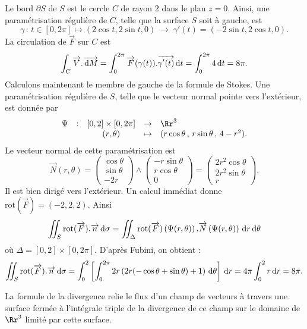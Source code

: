 \documentclass[class=report,crop=false]{standalone}
\begin{document}
\vskip3mm

\noindent Le bord $\partial S$ de $S$ est le cercle $C$ de rayon $2$ dans le plan $z=0$. Ainsi, une paramétrisation régulière de $C$, telle
que la surface $S$ soit à gauche, est 
$$\gamma \,:\,t\in [0,2\pi]\mapsto (2\cos t,2\sin t,0)\; \rightarrow \; \gamma'(t)=(-2\sin t,2\cos t,0).$$
La circulation de $\overrightarrow{F}$ sur $C$ est
$$\int _{C}\overrightarrow{V}.\overrightarrow{\,\mathrm{d} M}=\int _{0}^{2\pi}\overrightarrow{F}(\gamma (t)).\overrightarrow{\gamma '(t)}\,\mathrm{d} t=\int _{0}^{2\pi}4\,\mathrm{d} t=8\pi.$$
Calculons maintenant le membre de gauche de la formule de Stokes. Une paramétrisation
régulière de $S$, telle que le vecteur normal pointe vers l'extérieur, est donnée par 
$$\begin{array}{ccccl}\Psi &:&[0,2]\times [0,2\pi]&\to &\Rr^3\\ &&(r,\theta )&\mapsto & (r\cos \theta \, ,\, r\sin \theta  \, ,\, 4-r^2).\end{array}$$
Le vecteur normal de cette paramétrisation est
$$\overrightarrow{N}(r,\theta)=\left(\begin{array}{c}\cos \theta \\ \sin \theta \\ -2r\end{array}\right)\wedge \left(\begin{array}{c}-r\sin \theta \\ r\cos \theta \\ 0 \end{array}\right)=\left(\begin{array}{c}2r^2\cos \theta \\ 2r^2\sin \theta \\ r \end{array}\right).$$
Il est bien dirigé vers l'extérieur. Un calcul immédiat donne $\mathrm{rot}(\overrightarrow{F})=(-2,2,2)$. Ainsi
$$\int \!\!\!\!\int _S\mathrm{rot}(\overrightarrow{F}).\overrightarrow{n}\d \sigma =\int\!\!\!\!\int _{\Delta}\mathrm{rot}(\overrightarrow{F})\left(\Psi (r,\theta)\right).\overrightarrow{N}\left(\Psi (r,\theta)\right)\d r\d \theta $$
o\`u $\Delta =[0,2]\times [0,2\pi]$. D'après Fubini, on obtient :
$$\int \!\!\!\!\int _S\mathrm{rot}(\overrightarrow{F}).\overrightarrow{n}\,\mathrm{d} \sigma =\int _0^2\left[\int _0^{2\pi}2r\left(2r(-\cos \theta +\sin \theta )+1\right)\,\mathrm{d} \theta\right]\,\mathrm{d} r =4\pi \int _0^2r\,\mathrm{d} r=8\pi.$$

\vskip6mm

\noindent La formule de la divergence relie le flux d'un champ de vecteurs à travers une surface fermée à l'intégrale triple de la divergence de ce champ sur le domaine de $\Rr^3$ limité par cette surface.
\end{document}

